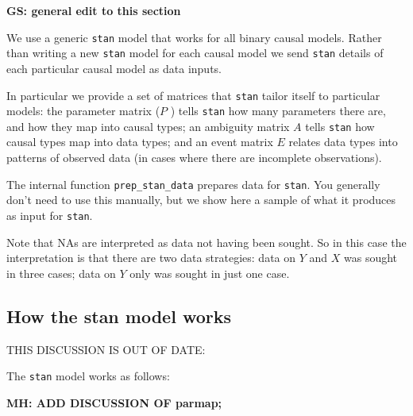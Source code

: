 \documentclass[
  11pt,
  article]{jss}
\begin{document}
\textbf{GS: general edit to this section}

We use a generic \texttt{stan} model that works for all binary causal
models. Rather than writing a new \texttt{stan} model for each causal
model we send \texttt{stan} details of each particular causal model as
data inputs.

In particular we provide a set of matrices that \texttt{stan} tailor
itself to particular models: the parameter matrix (\(P\) ) tells
\texttt{stan} how many parameters there are, and how they map into
causal types; an ambiguity matrix \(A\) tells \texttt{stan} how causal
types map into data types; and an event matrix \(E\) relates data types
into patterns of observed data (in cases where there are incomplete
observations).

The internal function \texttt{prep\_stan\_data} prepares data for
\texttt{stan}. You generally don't need to use this manually, but we
show here a sample of what it produces as input for \texttt{stan}.

Note that NAs are interpreted as data not having been sought. So in this
case the interpretation is that there are two data strategies: data on
\(Y\) and \(X\) was sought in three cases; data on \(Y\) only was sought
in just one case.

\hypertarget{how-the-stan-model-works}{%
\subsection{How the stan model works}\label{how-the-stan-model-works}}

THIS DISCUSSION IS OUT OF DATE:

The \texttt{stan} model works as follows:

\textbf{MH: ADD DISCUSSION OF parmap;}
\end{document}
